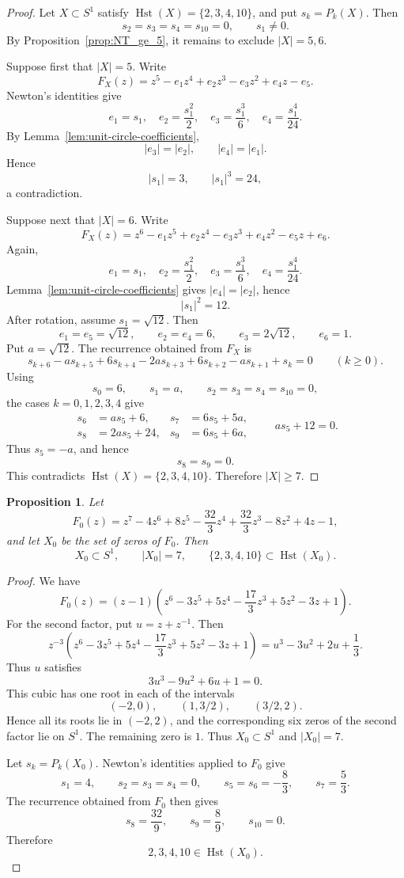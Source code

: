 \documentclass{amsart}
\newtheorem{prop}[thm]{Proposition}
\theoremstyle{definition}
\DeclareMathOperator{\Hst}{Hst}
\begin{document}
\begin{proof}
Let \(X\subset S^1\) satisfy \(\Hst(X)=\{2,3,4,10\}\), and put
\(s_k=P_k(X)\).  Then
\[
s_2=s_3=s_4=s_{10}=0,\qquad s_1\neq0.
\]
By Proposition~\ref{prop:NT_ge_5}, it remains to exclude \(|X|=5,6\).

Suppose first that \(|X|=5\).  Write
\[
F_X(z)=z^5-e_1z^4+e_2z^3-e_3z^2+e_4z-e_5.
\]
Newton's identities give
\[
e_1=s_1,\quad
e_2=\frac{s_1^2}{2},\quad
e_3=\frac{s_1^3}{6},\quad
e_4=\frac{s_1^4}{24}.
\]
By Lemma~\ref{lem:unit-circle-coefficients},
\[
|e_3|=|e_2|,
\qquad
|e_4|=|e_1|.
\]
Hence
\[
|s_1|=3,\qquad |s_1|^3=24,
\]
a contradiction.

Suppose next that \(|X|=6\).  Write
\[
F_X(z)=z^6-e_1z^5+e_2z^4-e_3z^3+e_4z^2-e_5z+e_6.
\]
Again,
\[
e_1=s_1,\quad
e_2=\frac{s_1^2}{2},\quad
e_3=\frac{s_1^3}{6},\quad
e_4=\frac{s_1^4}{24}.
\]
Lemma~\ref{lem:unit-circle-coefficients} gives \(|e_4|=|e_2|\), hence
\[
|s_1|^2=12.
\]
After rotation, assume \(s_1=\sqrt{12}\).  Then
\[
e_1=e_5=\sqrt{12},
\qquad
e_2=e_4=6,
\qquad
e_3=2\sqrt{12},
\qquad
e_6=1.
\]
Put \(a=\sqrt{12}\). The recurrence obtained from \(F_X\) is
\[
s_{k+6}-a s_{k+5}+6s_{k+4}-2a s_{k+3}
+6s_{k+2}-a s_{k+1}+s_k=0
\qquad(k\ge0).
\]
Using
\[
s_0=6,\qquad s_1=a,\qquad s_2=s_3=s_4=s_{10}=0,
\]
the cases \(k=0,1,2,3,4\) give
\[
\begin{aligned}
s_6&=a s_5+6, &
s_7&=6s_5+5a,\\
s_8&=2a s_5+24, &
s_9&=6s_5+6a,
\end{aligned}
\qquad
a s_5+12=0.
\]
Thus \(s_5=-a\), and hence
\[
s_8=s_9=0.
\]
This contradicts \(\Hst(X)=\{2,3,4,10\}\).  Therefore \(|X|\ge7\).
\end{proof}

\begin{prop}\label{prop:23410-example}
Let
\[
F_0(z)=
z^7-4z^6+8z^5-\frac{32}{3}z^4
+\frac{32}{3}z^3-8z^2+4z-1,
\]
and let \(X_0\) be the set of zeros of \(F_0\). Then
\[
X_0\subset S^1,\qquad |X_0|=7,
\qquad
\{2,3,4,10\}\subset \Hst(X_0).
\]
\end{prop}

\begin{proof}
We have
\[
F_0(z)=(z-1)
\left(
z^6-3z^5+5z^4-\frac{17}{3}z^3+5z^2-3z+1
\right).
\]
For the second factor, put \(u=z+z^{-1}\).  Then
\[
z^{-3}
\left(
z^6-3z^5+5z^4-\frac{17}{3}z^3+5z^2-3z+1
\right)
=
u^3-3u^2+2u+\frac13.
\]
Thus \(u\) satisfies
\[
3u^3-9u^2+6u+1=0.
\]
This cubic has one root in each of the intervals
\[
(-2,0),\qquad (1,3/2),\qquad (3/2,2).
\]
Hence all its roots lie in \((-2,2)\), and the corresponding six zeros
of the second factor lie on \(S^1\).  The remaining zero is \(1\).
Thus \(X_0\subset S^1\) and \(|X_0|=7\).

Let \(s_k=P_k(X_0)\). Newton's identities applied to \(F_0\) give
\[
s_1=4,\qquad
s_2=s_3=s_4=0,\qquad
s_5=s_6=-\frac83,\qquad
s_7=\frac53.
\]
The recurrence obtained from \(F_0\) then gives
\[
s_8=\frac{32}{9},\qquad
s_9=\frac89,\qquad
s_{10}=0.
\]
Therefore
\[
2,3,4,10\in\Hst(X_0).
\]
\end{proof}
\end{document}
